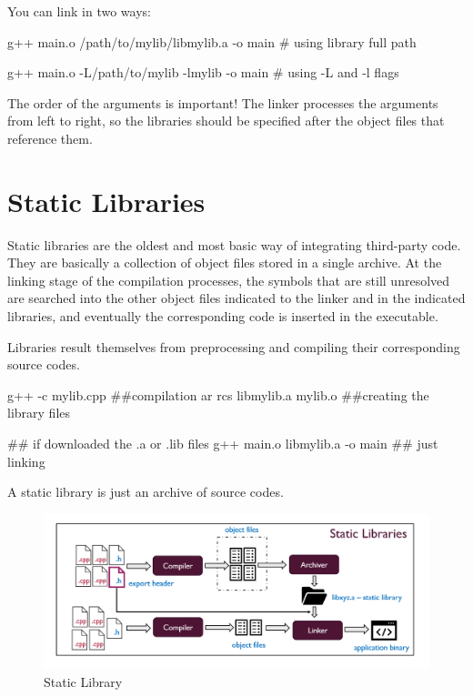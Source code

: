 You can link in two ways:
\begin{codeblock}[language=bash]
    g++ main.o /path/to/mylib/libmylib.a -o main  # using library full path
\end{codeblock}
\begin{codeblock}[language=bash]
    g++ main.o -L/path/to/mylib -lmylib -o main  # using -L and -l flags
\end{codeblock}

\begin{warningblock}
    The order of the arguments is important! The linker processes the arguments from left to right, so
    the libraries should be specified after the object files that reference them.
\end{warningblock}


\section{Static Libraries}
Static libraries are the oldest and most basic way of integrating third-party code. They are basically
a collection of object files stored in a single archive.
At the linking stage of the compilation processes, the symbols that are still unresolved are
searched into the other object files indicated to the linker and in the indicated libraries, and
eventually the corresponding code is inserted in the executable.

Libraries result themselves from preprocessing and compiling their corresponding source codes. 

\begin{codeblock}[language=bash]
    g++ -c mylib.cpp  ##compilation
    ar rcs libmylib.a mylib.o  ##creating the library files 

    ## if downloaded the .a or .lib files 
    g++ main.o libmylib.a -o main ## just linking
\end{codeblock}

\begin{definitionblock}
A static library is just an archive of source codes.
\end{definitionblock}

\begin{figure}[H]
    \centering
    \includegraphics[width=\textwidth]{assets/static_lib.png}
    \caption{Static Library}
\end{figure}

